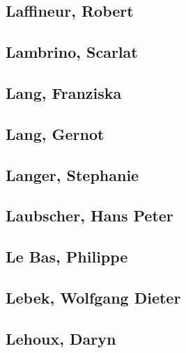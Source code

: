 \subsection[Laffineur, Robert (1)]{Laffineur, Robert}

\subsection[Lambrino, Scarlat (1)]{Lambrino, Scarlat}

\subsection[Lang, Franziska (1)]{Lang, Franziska}

\subsection[Lang, Gernot (1)]{Lang, Gernot}

\subsection[Langer, Stephanie (2)]{Langer, Stephanie}


\subsection[Laubscher, Hans Peter (1)]{Laubscher, Hans Peter}

\subsection[Le Bas, Philippe (1)]{Le Bas, Philippe}

\subsection[Lebek, Wolfgang Dieter (1)]{Lebek, Wolfgang Dieter}

\subsection[Lehoux, Daryn (2)]{Lehoux, Daryn}

